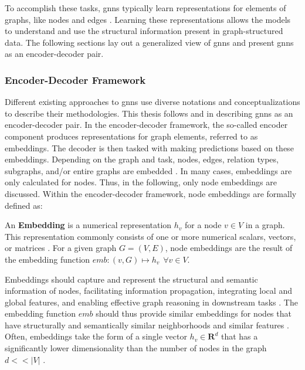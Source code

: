 To accomplish these tasks, \glspl{gnn} typically learn representations for elements of graphs, like nodes and edges \cite{zhou_graph_2020}. Learning these representations allows the models to understand and use the structural information present in graph-structured data. The following sections lay out a generalized view of \glspl{gnn} and present \glspl{gnn} as an encoder-decoder pair.

\subsubsection{Encoder-Decoder Framework}
\label{s_Background_GNNs_EncoderDecoderFramework}

Different existing approaches to \glspl{gnn} use diverse notations and conceptualizations to describe their methodologies. This thesis follows \cite{hamilton_representation_2017} and \cite{kazemi_representation_2019} in describing \glspl{gnn} as an encoder-decoder pair.
In the encoder-decoder framework, the so-called encoder component produces representations for graph elements, referred to as embeddings. The decoder is then tasked with making predictions based on these embeddings. Depending on the graph and task, nodes, edges, relation types, subgraphs, and/or entire graphs are embedded \cite{barros_survey_2023}. In many cases, embeddings are only calculated for nodes. Thus, in the following, only node embeddings are discussed. Within the encoder-decoder framework, node embeddings are formally defined as: 

\begin{definition}
    \label{d_Embedding}
    An \textbf{Embedding} is a numerical representation $h_v$ for a node $v \in V$ in a graph. This representation commonly consists of one or more numerical scalars, vectors, or matrices \cite{kazemi_representation_2019}. For a given graph $G = (V, E)$, node embeddings are the result of the embedding function $emb: (v, G) \mapsto h_v \hspace{5pt} \forall v \in V$.
\end{definition}

\newpage

Embeddings should capture and represent the structural and semantic information of nodes, facilitating information propagation, integrating local and global features, and enabling effective graph reasoning in downstream tasks \cite{goyal_graph_2018}. The embedding function $emb$ should thus provide similar embeddings for nodes that have structurally and semantically similar neighborhoods and similar features \cite{goyal_graph_2018, bronstein_geometric_2021}.
Often, embeddings take the form of a single vector $h_v \in \mathbf{R}^d$ that has a significantly lower dimensionality than the number of nodes in the graph $d<<|V|$ \cite{goyal_graph_2018}. 

